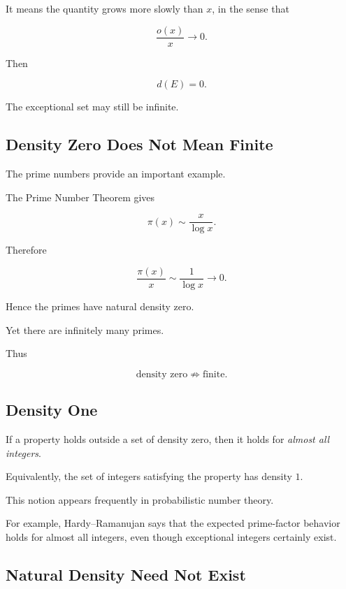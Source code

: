 It means the quantity grows more slowly than \(x\), in the sense that

\[ \frac{o(x)}x\to0. \]

Then

\[ d(E)=0. \]

The exceptional set may still be infinite.

\subsection{Density Zero Does Not Mean Finite}
\label{subsec:density-zero-not-finite}

The prime numbers provide an important example.

The Prime Number Theorem gives

\[ \pi(x)\sim\frac{x}{\log x}. \]

Therefore

\[ \frac{\pi(x)}x\sim\frac1{\log x}\to0. \]

Hence the primes have natural density zero.

Yet there are infinitely many primes.

Thus

\[
\boxed{
\text{density zero}
\not\Longrightarrow
\text{finite}.
}
\]

\subsection{Density One}
\label{subsec:density-one}

If a property holds outside a set of density zero, then it holds for
\emph{almost all integers}.

Equivalently, the set of integers satisfying the property has density \(1\).

This notion appears frequently in probabilistic number theory.

For example, Hardy--Ramanujan says that the expected prime-factor behavior
holds for almost all integers, even though exceptional integers certainly
exist.

\subsection{Natural Density Need Not Exist}
\label{subsec:natural-density-nonexistence}

